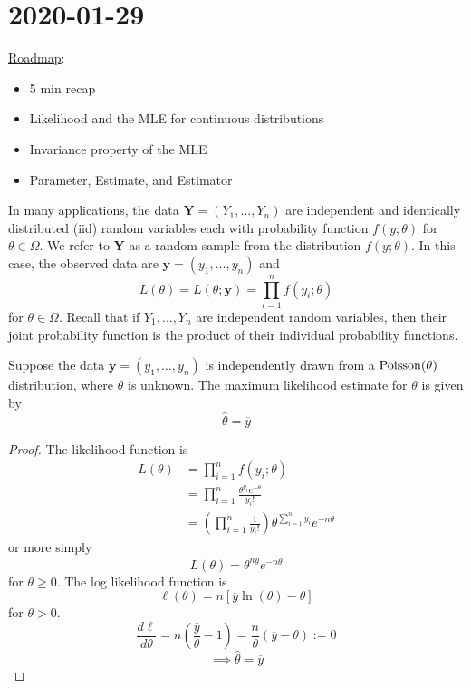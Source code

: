\section{2020-01-29}
\underline{Roadmap}:
\begin{itemize}
    \item 5 min recap
    \item Likelihood and the MLE for continuous distributions
    \item Invariance property of the MLE
    \item Parameter, Estimate, and Estimator
\end{itemize}
\begin{defbox}
    \begin{definition}
        In many applications, the data $ \bm{Y}=(Y_1,\ldots ,Y_n) $ are independent
        and identically distributed (iid) random variables each with probability function
        $ f(y;\theta) $ for $ \theta\in\Omega $. We refer to $ \bm{Y} $
        as a random sample from the distribution $ f(y;\theta) $. In this case,
        the observed data are $ \bm{y}=(y_1,\ldots ,y_n) $ and
        \[ L(\theta)=L(\theta;\bm{y})=\prod_{i=1}^n f(y_i;\theta) \]
        for $ \theta\in\Omega $. Recall that if $ Y_1,\ldots ,Y_n $ are
        independent random variables, then their joint probability function is
        the product of their individual probability functions.
    \end{definition}
\end{defbox}

\begin{thmbox}
    \begin{prop}
        Suppose the data $ \bm{y}=(y_1,\ldots ,y_n) $ is independently
        drawn from a $ \operatorname{Poisson}(\theta) $ distribution, where $ \theta $ is unknown.
        The maximum likelihood estimate for $ \theta $ is given by
        \[ \hat{\theta}=\overline{y} \]
    \end{prop}
\end{thmbox}
\begin{proof}
    The likelihood function is
    \begin{align*}
        L(\theta) & =
        \prod_{i=1}^n f(y_i;\theta)                                     \\
                  & =\prod_{i=1}^n \frac{\theta^{y_i}e^{-\theta}}{y_i!} \\
                  & =\left( \prod_{i=1}^n  \frac{1}{y_i!} \right)
        \theta^{\sum\limits_{i=1}^{n} y_i}e^{-n\theta}
    \end{align*}
    or more simply
    \[ L(\theta)=\theta^{n\overline{y}}e^{-n\theta} \]
    for $ \theta\geqslant 0 $. The log likelihood function is
    \[ \ell(\theta)=n\left[ \overline{y}\ln(\theta)-\theta \right] \]
    for $ \theta>0 $.
    \[ \frac{d\ell}{d\theta} =n\left( \frac{\overline{y}}{\theta}-1 \right)=\frac{n}{\theta}
        \left( \overline{y}-\theta \right):=0 \]
    \[ \implies \hat{\theta}=\overline{y} \]
\end{proof}

